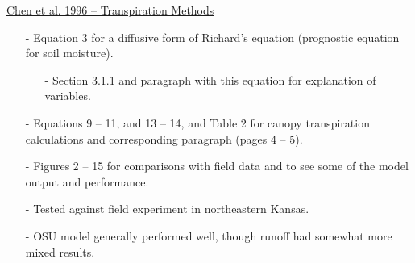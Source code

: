 \documentclass[12pt, letterpaper]{article}
\begin{document}
    \underline{Chen et al. 1996 -- Transpiration Methods}
    \begin{itemize}
    	\item[-] Equation 3 for a diffusive form of Richard's equation (prognostic equation for soil
    	         moisture).
    	\begin{itemize}
    		\item[-] Section 3.1.1 and paragraph with this equation for explanation of variables.
    	\end{itemize}
        \item[-] Equations 9 -- 11, and 13 -- 14, and Table 2 for canopy transpiration calculations and
                 corresponding paragraph (pages 4 -- 5).
        \item[-] Figures 2 -- 15 for comparisons with field data and to see some of the model output
                 and performance.
        \item[-] Tested against field experiment in northeastern Kansas.
        \item[-] OSU model generally performed well, though runoff had somewhat more mixed results.
    \end{itemize}
\end{document}
